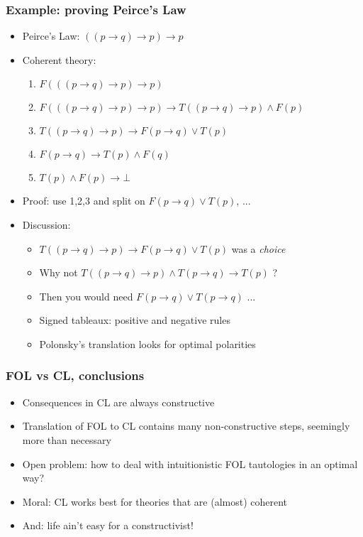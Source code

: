 \documentclass[handout,11pt]{beamer}
\newcommand{\imp}{\rightarrow}
\newcommand{\proves}{\vdash}
\begin{document}
\begin{frame}
\frametitle{Example: proving Peirce's Law}
 \begin{itemize}[<+->] 
    \item Peirce's Law: $((p\imp q)\imp p)\imp p$
    \item Coherent theory:
    \begin{enumerate}[<+->]
    	\item $F(((p\imp q)\imp p)\imp p)$
    	\item $F(((p\imp q)\imp p)\imp p) \imp T((p\imp q)\imp p) \wedge F(p)$
    	\item $T((p\imp q)\imp p) \imp F(p\imp q) \vee T(p)$
    	\item $F(p\imp q) \imp T(p) \wedge F(q)$
    	\item $T(p) \wedge F(p) \imp \bot$
    \end{enumerate}
    \item Proof: use 1,2,3 and split on $F(p\imp q) \vee T(p)$, ...
    \item Discussion: 
    \begin{itemize}[<+->]
      \item $T((p\imp q)\imp p) \imp F(p\imp q) \vee T(p)$ was a \emph{choice}
      \item Why not $T((p\imp q)\imp p) \wedge T(p\imp q) \imp T(p)$ ?
      \item Then you would need $F(p\imp q) \vee T(p\imp q)$ ...
      \item Signed tableaux: positive and negative rules  %
     \item Polonsky's translation looks for optimal polarities
 \end{itemize}  
 \end{itemize}
\end{frame}


\begin{frame}
\frametitle{FOL vs CL, conclusions}
 \begin{itemize}[<+->]
\item Consequences in CL are always constructive
\item Translation of FOL to CL contains many non-constructive steps,
seemingly more than necessary
\item Open problem: how to deal with \alert{intuitionistic} FOL tautologies
in an optimal way?
\item Moral: CL works best for theories that are (almost) coherent
\item And: life ain't easy for a constructivist!
\end{itemize}
\end{frame}
\end{document}
